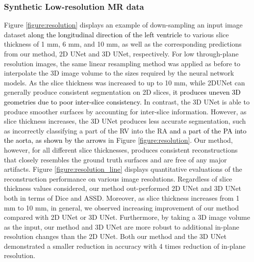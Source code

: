 \documentclass[times,review,preprint,authoryear]{elsarticle}
\begin{document}
\subsubsection{Synthetic Low-resolution MR data} Figure \ref{figure:resolution} displays an example of down-sampling an input image dataset \textcolor{black}{along the longitudinal direction of the left ventricle }to various slice thickness of 1 mm, 6 mm, and 10 mm, as well as the corresponding predictions from our method, 2D UNet and 3D UNet, respectively. For low through-plane resolution images, the same linear resampling method was applied as before to interpolate the 3D image volume to the sizes required by the neural network models. As the slice thickness was increased to up to 10 mm, while 2DUNet can generally produce consistent segmentation on 2D slices, \textcolor{black}{it produces uneven 3D geometries due to poor inter-slice consistency.} In contrast, the 3D UNet is able to produce smoother surfaces by accounting for inter-slice information. However, as slice thickness increases, the 3D UNet produces less accurate segmentation, such as incorrectly classifying a part of the RV into the RA \textcolor{black}{and a part of the PA into the aorta, as shown by the arrows} in Figure \ref{figure:resolution}. Our method, however, for all different slice thicknesses, produces consistent reconstructions that closely resembles the ground truth surfaces and are free of any major artifacts. Figure \ref{figure:resolution_line} displays quantitative evaluations of the reconstruction performance on various image resolutions. Regardless of slice thickness values considered, our method out-performed 2D UNet and 3D UNet both in terms of Dice and ASSD. Moreover, as slice thickness increases from 1 mm to 10 mm, in general, we observed increasing improvement of our method compared with 2D UNet or 3D UNet. Furthermore, by taking a 3D image volume as the input, our method and 3D UNet are more robust to additional in-plane resolution changes than the 2D UNet. Both our method and the 3D UNet demonstrated a smaller reduction in accuracy with 4 times reduction of in-plane resolution. 
\end{document}
